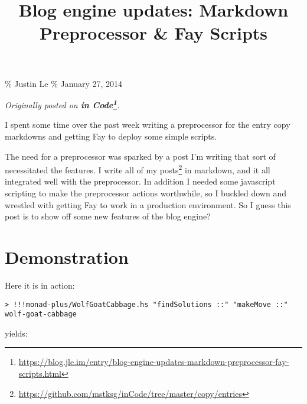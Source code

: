 \documentclass[]{article}
\title{Blog engine updates: Markdown Preprocessor \& Fay Scripts}
\renewcommand{\href}[2]{#2\footnote{\url{#1}}}
\begin{document}
\maketitle

\% Justin Le \% January 27, 2014

\emph{Originally posted on
\textbf{\href{https://blog.jle.im/entry/blog-engine-updates-markdown-preprocessor-fay-scripts.html}{in
Code}}.}

I spent some time over the past week writing a preprocessor for the entry copy
markdowns and getting Fay to deploy some simple scripts.

The need for a preprocessor was sparked by a post I'm writing that sort of
necessitated the features. I write
\href{https://github.com/mstksg/inCode/tree/master/copy/entries}{all of my
posts} in markdown, and it all integrated well with the preprocessor. In
addition I needed some javascript scripting to make the preprocessor actions
worthwhile, so I buckled down and wrestled with getting Fay to work in a
production environment. So I guess this post is to show off some new features of
the blog engine?

\section{Demonstration}\label{demonstration}

Here it is in action:

\begin{verbatim}
> !!!monad-plus/WolfGoatCabbage.hs "findSolutions ::" "makeMove ::" wolf-goat-cabbage
\end{verbatim}

yields:
\end{document}
